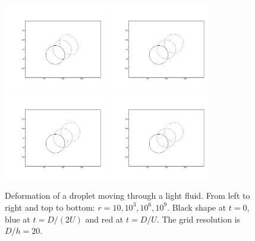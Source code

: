 \begin{figure}
\begin{center}
\includegraphics[width=0.4\textwidth]{Figures/Sagar/a.png}
\quad\includegraphics[width=0.4\textwidth]{Figures/Sagar/b.png} \\
\includegraphics[width=0.4\textwidth]{Figures/Sagar/c.png}
\quad\includegraphics[width=0.4\textwidth]{Figures/Sagar/d.png} \\
\end{center}
\caption{Deformation of a droplet moving through a light fluid. 
From left to right and top to bottom: $r=10,10^3,10^6,10^9$. 
Black shape at $t=0$, blue at $t=D/(2U)$ and red at $t=D/U$. 
The grid resolution is $D/h=20$.}
\label{rich}
\end{figure}

